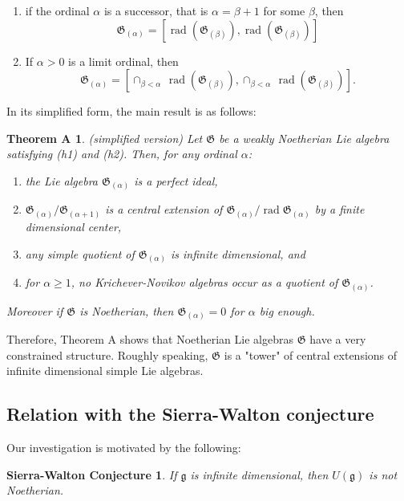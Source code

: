 \documentclass[11pt, letterpaper, reqno]{amsart}
\newtheorem*{mainA}{Theorem A}
\newtheorem{SWconjecture}[theorem]{Sierra-Walton Conjecture}
\theoremstyle{definition}
\newcommand{\rad}{\operatorname{rad}}
\newcommand{\fg}{\mathfrak{g}}
\newcommand{\fG}{\mathfrak{G}}
\begin{document}
\begin{enumerate}
\item[(a)] if the ordinal $\alpha$ is a successor,
that is $\alpha=\beta+1$ for some $\beta$, then
$$\fG_{(\alpha)}=
[\rad(\fG_{(\beta)}),\rad(\fG_{(\beta)})]$$
\item[(b)] If $\alpha>0$ is a limit ordinal, then
$$\fG_{(\alpha)}=[\cap_{\beta<\alpha}\,\rad(\fG_{(\beta)}), \cap_{\beta<\alpha}\,\rad(\fG_{(\beta)})].$$
\end{enumerate}


 

In its simplified form, 
the main result is as follows:

\begin{mainA} (simplified version) Let $\fG$ be a weakly Noetherian Lie algebra 
satisfying (h1) and (h2).
Then, for any ordinal $\alpha$:

\begin{enumerate}
\item[(a)] the Lie algebra $\fG_{(\alpha)}$
is a  perfect ideal,

\item[(b)] 
$\fG_{(\alpha)}/\fG_{(\alpha+1)}$
is a central extension of 
$\fG_{(\alpha)}/\rad\fG_{(\alpha)}$ by a finite
dimensional center,


\item[(c)] any
simple quotient  of $\fG_{(\alpha)}$ is infinite dimensional,
and

\item[(d)]
for $\alpha\geq 1$, no Krichever-Novikov algebras occur as a quotient of $\fG_{(\alpha)}$.
\end{enumerate}
\smallskip
Moreover if $\fG$ is Noetherian,
then $\fG_{(\alpha)}=0$ for $\alpha$ big enough.
\end{mainA}

Therefore, Theorem A shows that Noetherian Lie algebras $\fG$ have a very
constrained structure. Roughly speaking, $\fG$
is a "tower" of central extensions of 
 infinite dimensional  simple Lie algebras. 


\subsection{Relation with the Sierra-Walton conjecture}

\noindent Our investigation is motivated by the following:

\begin{SWconjecture}\label{conjecture:enveloping-Noetherian} \cite{Sierra-Walton}
If $\fg$ is infinite dimensional, then $U(\fg)$ is  not Noetherian.
\end{SWconjecture}
\end{document}
